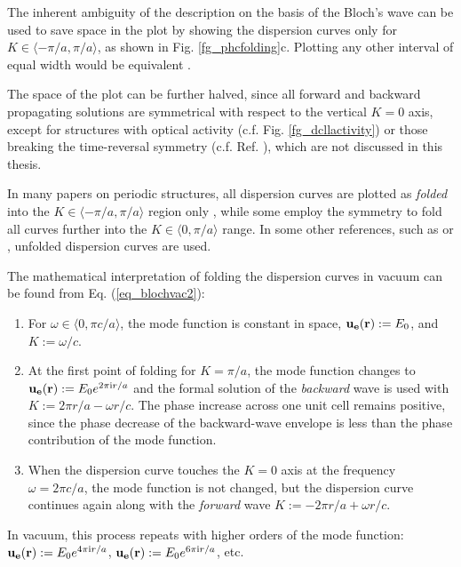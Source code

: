 \label{par_disp_curv_per}
The inherent ambiguity of the description on the basis of the Bloch's wave can be used to save space in the plot by showing the dispersion curves only for $K\in\langle-\pi/a, \pi/a\rangle$, as shown in Fig. \ref{fg_phcfolding}c. Plotting any other interval of equal width would be equivalent \cite[p. 177]{brillouin2003wave}. 

The space of the plot can be further halved, since all forward and backward propagating solutions are symmetrical with respect to the vertical $K=0$ axis, except for structures with optical activity (c.f. Fig. \ref{fg_dcllactivity}) or those breaking the time-reversal symmetry (c.f. Ref. \cite{vanwolleghem2009unidirectional}), which are not discussed in this thesis. 

In many papers on periodic structures, all dispersion curves are plotted as \textit{folded} into the $K\in\langle -\pi/a, \pi/a\rangle$ region only \cite{obrien2002photonic, yannopapas2005negative, chakrabarti2012magnetic}, while some employ the symmetry to fold  all curves further into the $K\in\langle0, \pi/a\rangle$ range. %
In some other references, such as \cite{mortensen2010unambiguous} or \cite{yeh1977electromagnetic}, unfolded dispersion curves are used.

The mathematical interpretation of folding the dispersion curves in vacuum can be found from Eq. (\ref{eq_blochvac2}): 
\begin{enumerate}
\item{
For  $\omega\in\langle 0, \pi c /a\rangle$, the mode function is constant in space, $\mathbf{u_e}({\mathbf{r}}) := E_0$, and $K := \omega/c$. 
} 
\item{
At the first point of folding for $K=\pi/a$, the mode function changes to $\mathbf{u_e}({\mathbf{r}}) := E_0 e^{2\pi{\mathrm i} r/a}$ and the formal solution of the \textit{backward} wave is used with $K := 2\pi r/a - \omega r/c$.  The phase increase across one unit cell remains positive, since the phase decrease of the backward-wave envelope is less than the phase contribution of the mode function.
} 
\item{
When the dispersion curve touches the $K=0$ axis at the frequency $\omega = 2\pi c/a$, the mode function is not changed, but the dispersion curve continues again along with the \textit{forward} wave $K := - 2\pi r/a + \omega r/c$. 
} 
 \end{enumerate}
In vacuum, this process repeats with higher orders of the mode function: $\mathbf{u_e}({\mathbf{r}}) := E_0 e^{4\pi{\mathrm i} r/a}$, $\mathbf{u_e}({\mathbf{r}}) := E_0 e^{6\pi{\mathrm i} r/a}$, etc.

